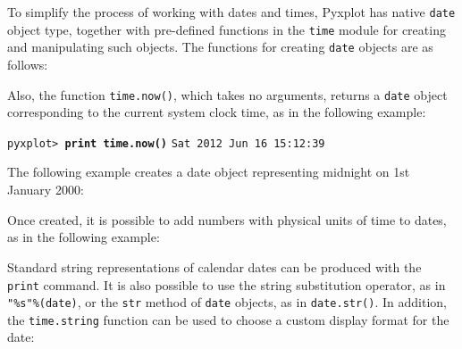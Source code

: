 To simplify the process of working with dates and times, Pyxplot has native
{\tt date} object type, together with pre-defined functions in the {\tt time}
module for creating and manipulating such objects. The functions for creating
{\tt date} objects are as follows:


Also, the function {\tt time.now()}, which takes no
arguments, returns a {\tt date} object corresponding to the current system
clock time, as in the following example:

\vspace{3mm}
\noindent\texttt{pyxplot> \textbf{print time.now()}}\newline
\noindent\texttt{Sat 2012 Jun 16 15:12:39}
\vspace{3mm}

The following example creates a date object representing midnight on 1st January 2000:

\vspace{3mm}

\vspace{3mm}

Once created, it is possible to add numbers with physical units of time to
dates, as in the following example:

\vspace{3mm}

\vspace{3mm}

Standard string representations of calendar dates can be produced with the {\tt
print} command.  It is also possible to use the string substitution operator,
as in {\tt "\%s"\%(date)}, or the {\tt str} method of {\tt date} objects, as in
{\tt date.str()}.  In addition, the {\tt time.string} function can be used to
choose a custom display format for the date:


